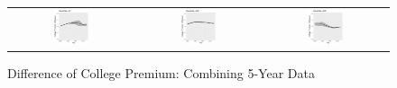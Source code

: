 \documentclass[beamer, t]{beamer}
\begin{document}
\begin{frame}

\begin{figure}
    \centering
    \caption{Difference of College Premium: Combining 5-Year Data} %
    \label{fig:diff_5yr_full}
    \hskip15pt
    \begin{tabular}{c c c}
        \includegraphics[width=0.3\textwidth]{figures/diff_chart_0.1_03_FullT_5yr.png} & \includegraphics[width=0.3\textwidth]{figures/diff_chart_0.5_03_FullT_5yr.png} & \includegraphics[width=0.3\textwidth]{figures/diff_chart_0.9_03_FullT_5yr.png} 
    \end{tabular}
\end{figure}
\end{frame}
\end{document}
